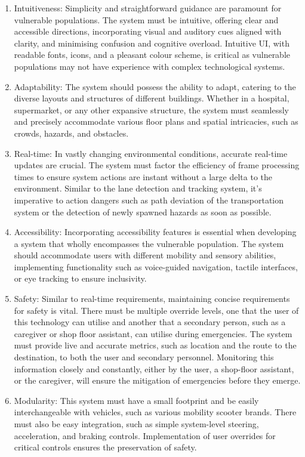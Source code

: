 \documentclass[9pt,conference]{IEEEtran}
\begin{document}
\begin{enumerate}[label=\alph*.]
    \item Intuitiveness: Simplicity and straightforward guidance are paramount for vulnerable populations. The system must be intuitive, offering clear and accessible directions, incorporating visual and auditory cues aligned with clarity, and minimising confusion and cognitive overload. Intuitive UI, with readable fonts, icons, and a pleasant colour scheme, is critical as vulnerable populations may not have experience with complex technological systems.
    \item Adaptability: The system should possess the ability to adapt, catering to the diverse layouts and structures of different buildings. Whether in a hospital, supermarket, or any other expansive structure, the system must seamlessly and precisely accommodate various floor plans and spatial intricacies, such as crowds, hazards, and obstacles.
    \item Real-time: In vastly changing environmental conditions, accurate real-time updates are crucial. The system must factor the efficiency of frame processing times to ensure system actions are instant without a large delta to the environment. Similar to the lane detection and tracking system, it's imperative to action dangers such as path deviation of the transportation system or the detection of newly spawned hazards as soon as possible.
    \item Accessibility: Incorporating accessibility features is essential when developing a system that wholly encompasses the vulnerable population. The system should accommodate users with different mobility and sensory abilities, implementing functionality such as voice-guided navigation, tactile interfaces, or eye tracking to ensure inclusivity.
    \item Safety: Similar to real-time requirements, maintaining concise requirements for safety is vital. There must be multiple override levels, one that the user of this technology can utilise and another that a secondary person, such as a caregiver or shop floor assistant, can utilise during emergencies. The system must provide live and accurate metrics, such as location and the route to the destination, to both the user and secondary personnel. Monitoring this information closely and constantly, either by the user, a shop-floor assistant, or the caregiver, will ensure the mitigation of emergencies before they emerge.
    \item Modularity: This system must have a small footprint and be easily interchangeable with vehicles, such as various mobility scooter brands. There must also be easy integration, such as simple system-level steering, acceleration, and braking controls. Implementation of user overrides for critical controls ensures the preservation of safety.
\end{enumerate}
\end{document}
